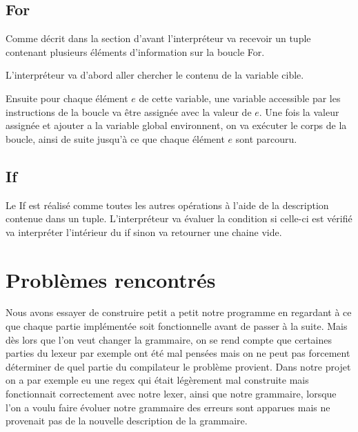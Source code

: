 \documentclass[report,10pt,a4paper]{memoir}
\begin{document}
\subsection*{For}
Comme décrit dans la section d'avant l'interpréteur va recevoir un tuple contenant plusieurs éléments d'information sur
la boucle For.

L'interpréteur va d'abord aller chercher le contenu de la variable cible.

Ensuite pour chaque élément $e$ de cette variable, une variable accessible par les instructions de la boucle va être assignée avec la valeur de $e$.
Une fois la valeur assignée et ajouter a la variable global environnent, on va exécuter le corps de la boucle, ainsi de suite jusqu'à ce que chaque élément $e$ sont parcouru.
\subsection*{If}
Le If est réalisé comme toutes les autres opérations à l'aide de la description contenue dans un tuple.
L'interpréteur va évaluer la condition si celle-ci est vérifié va interpréter l'intérieur du if sinon va retourner une chaine vide.
\section*{Problèmes rencontrés}
Nous avons essayer de construire petit a petit notre programme en regardant à ce que chaque partie implémentée soit fonctionnelle avant de passer à la suite.
Mais dès lors que l'on veut changer la grammaire, on se rend compte que certaines parties du lexeur par exemple ont été mal pensées mais on ne peut pas forcement déterminer de quel partie du compilateur le problème provient.
Dans notre projet on a par exemple eu une regex qui était légèrement mal construite mais fonctionnait correctement avec notre lexer, ainsi que notre grammaire, lorsque l'on a voulu faire évoluer notre grammaire des erreurs sont apparues mais ne provenait pas de la nouvelle description de la grammaire.
\end{document}
